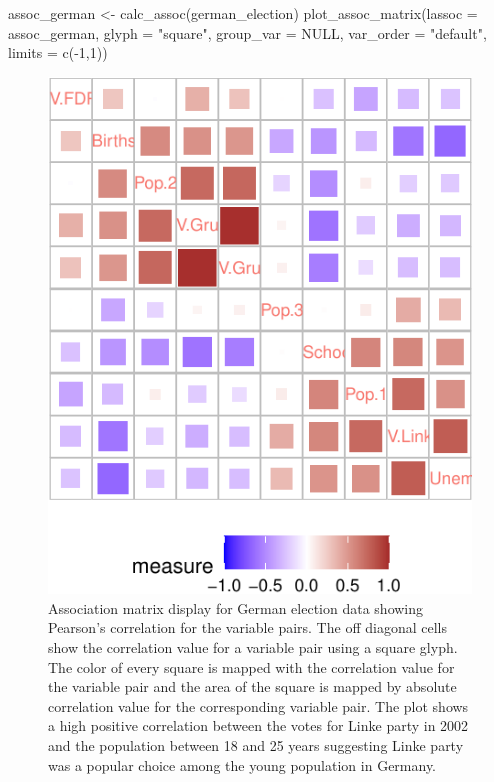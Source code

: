 \begin{Schunk}
\begin{Sinput}
assoc_german <- calc_assoc(german_election)
plot_assoc_matrix(lassoc = assoc_german,
                  glyph = "square",
                  group_var = NULL,
                  var_order = "default",
                  limits = c(-1,1))
\end{Sinput}
\begin{figure}

{\centering \includegraphics{rj_paper_files/figure-latex/assoc-matrix-germanelection-1} 

}

\caption[Association matrix display for German election data showing Pearson's correlation for the variable pairs]{Association matrix display for German election data showing Pearson's correlation for the variable pairs. The off diagonal cells show the correlation value for a variable pair using a square glyph. The color of every square is mapped with the correlation value for the variable pair and the area of the square is mapped by absolute correlation value for the corresponding variable pair. The plot shows a high positive correlation between the votes for Linke party in 2002 and the population between 18 and 25 years suggesting Linke party was a popular choice among the young population in Germany.}\label{fig:assoc-matrix-germanelection}
\end{figure}
\end{Schunk}

